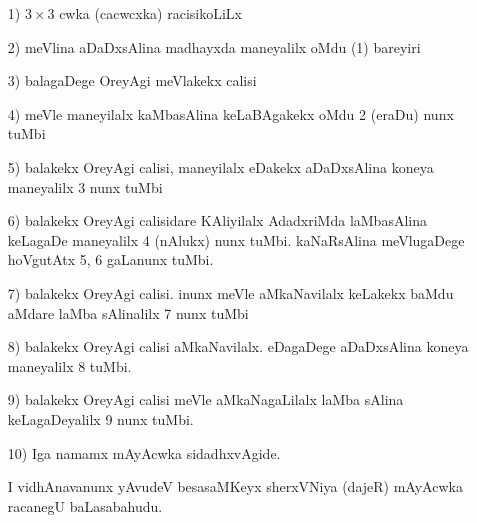 \begin{enumerate}
\item[{\rm 1)}]  $3\times 3$ cwka (cacwcxka) racisikoLiLx

\item[{\rm 2)}] meVlina aDaDxsAlina madhayxda maneyalilx oMdu {\rm (1)} bareyiri

\item[{\rm 3)}] balagaDege OreyAgi meVlakekx calisi

\item[{\rm 4)}] meVle maneyilalx kaMbasAlina keLaBAgakekx oMdu {\rm 2} (eraDu) nunx tuMbi

\item[{\rm 5)}] balakekx OreyAgi calisi, maneyilalx eDakekx aDaDxsAlina koneya maneyalilx {\rm 3} nunx tuMbi

\item[{\rm 6)}] balakekx OreyAgi calisidare KAliyilalx AdadxriMda laMbasAlina keLagaDe maneyalilx {\rm 4} (nAlukx) nunx tuMbi. kaNaRsAlina meVlugaDege hoVgutAtx {\rm 5, 6} gaLanunx tuMbi.

\item[{\rm 7)}] balakekx OreyAgi calisi. inunx meVle aMkaNavilalx keLakekx baMdu aMdare laMba sAlinalilx {\rm 7} nunx tuMbi

\item[{\rm 8)}] balakekx OreyAgi calisi aMkaNavilalx. eDagaDege aDaDxsAlina koneya maneyalilx {\rm 8} tuMbi.

\item[{\rm 9)}] balakekx OreyAgi calisi meVle aMkaNagaLilalx laMba sAlina keLagaDeyalilx {\rm 9} nunx tuMbi.

\item[{\rm 10)}] Iga namamx mAyAcwka sidadhxvAgide.

 I vidhAnavanunx yAvudeV besasaMKeyx sherxVNiya (dajeR) mAyAcwka racanegU baLasabahudu.
\end{enumerate}

